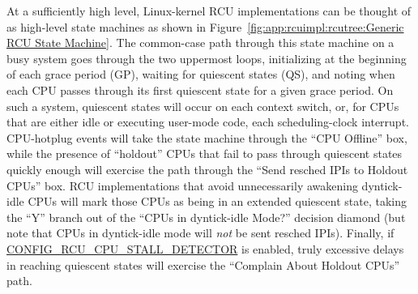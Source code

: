 At a sufficiently high level, Linux-kernel RCU implementations can
be thought of as high-level state machines as shown in
Figure~\ref{fig:app:rcuimpl:rcutree:Generic RCU State Machine}.
The common-case path through this state machine on a busy system
goes through the two uppermost loops, initializing at the
beginning of each grace period (GP),
waiting for quiescent states (QS), and noting when each CPU passes through
its first quiescent state for a given grace period.
On such a system, quiescent states will occur on each context switch,
or, for CPUs that are either idle or executing user-mode code, each
scheduling-clock interrupt.
CPU-hotplug events will take the state machine through the
``CPU Offline'' box, while the presence of ``holdout''
CPUs that fail to pass through quiescent states quickly enough will exercise
the path through the ``Send resched IPIs to Holdout CPUs'' box.
RCU implementations that avoid unnecessarily awakening dyntick-idle
CPUs will mark those CPUs as being in an extended quiescent state,
taking the ``Y'' branch out of the ``CPUs in dyntick-idle
Mode?'' decision diamond (but note that CPUs in dyntick-idle mode
will \emph{not} be sent resched IPIs).
Finally, if \url{CONFIG_RCU_CPU_STALL_DETECTOR} is enabled,
truly excessive delays in reaching quiescent states will exercise the
``Complain About Holdout CPUs'' path.

 \QuickQuizEnd

